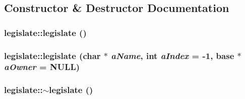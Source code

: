 \subsection{Constructor \& Destructor Documentation}
\hypertarget{classlegislate_a64eb8d7a8bd6b552187b279476135bda}{
\subsubsection[{legislate}]{\setlength{\rightskip}{0pt plus 5cm}legislate::legislate ()}}
\label{classlegislate_a64eb8d7a8bd6b552187b279476135bda}
\hypertarget{classlegislate_adbe3b26cc6e03c3ab2fa9618c7c4916e}{
\subsubsection[{legislate}]{\setlength{\rightskip}{0pt plus 5cm}legislate::legislate (char $\ast$ {\em aName}, \/  int {\em aIndex} = {\ttfamily -\/1}, \/  {\bf base} $\ast$ {\em aOwner} = {\ttfamily NULL})}}
\label{classlegislate_adbe3b26cc6e03c3ab2fa9618c7c4916e}
\hypertarget{classlegislate_a7119b4f1b6d127bd8de4a2cb137325e2}{
\subsubsection[{$\sim$legislate}]{\setlength{\rightskip}{0pt plus 5cm}legislate::$\sim$legislate ()}}
\label{classlegislate_a7119b4f1b6d127bd8de4a2cb137325e2}


